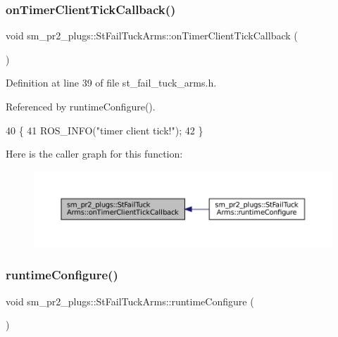 \subsubsection{\texorpdfstring{on\+Timer\+Client\+Tick\+Callback()}{onTimerClientTickCallback()}}
{\footnotesize\ttfamily void sm\+\_\+pr2\+\_\+plugs\+::\+St\+Fail\+Tuck\+Arms\+::on\+Timer\+Client\+Tick\+Callback (\begin{DoxyParamCaption}{ }\end{DoxyParamCaption})\hspace{0.3cm}{\ttfamily [inline]}}



Definition at line 39 of file st\+\_\+fail\+\_\+tuck\+\_\+arms.\+h.



Referenced by runtime\+Configure().


\begin{DoxyCode}
40     \{
41         ROS\_INFO(\textcolor{stringliteral}{"timer client tick!"});
42     \}
\end{DoxyCode}
Here is the caller graph for this function\+:
\nopagebreak
\begin{figure}[H]
\begin{center}
\leavevmode
\includegraphics[width=350pt]{structsm__pr2__plugs_1_1StFailTuckArms_a4ef9ad7a1e3f13c41ad1903cc642bcb5_icgraph}
\end{center}
\end{figure}
\mbox{\label{structsm__pr2__plugs_1_1StFailTuckArms_aa120c686b41ea5ab0e55d4545757cc1d}} 
\subsubsection{\texorpdfstring{runtime\+Configure()}{runtimeConfigure()}}
{\footnotesize\ttfamily void sm\+\_\+pr2\+\_\+plugs\+::\+St\+Fail\+Tuck\+Arms\+::runtime\+Configure (\begin{DoxyParamCaption}{ }\end{DoxyParamCaption})\hspace{0.3cm}{\ttfamily [inline]}}



